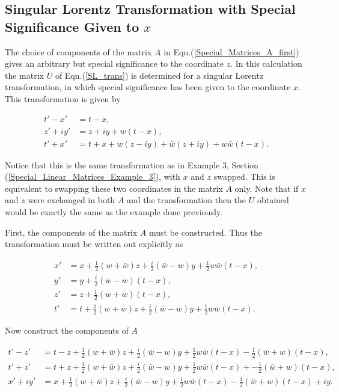 \newpage

\begin{appendix}

\section{Singular Lorentz Transformation with Special Significance Given to $x$}\label{Appendix_Special_Significance_x}

The choice of components of the matrix $A$ in Eqn.(\ref{Special_Matrices_A_first}) gives an arbitrary but special significance to the coordinate $z$. In this calculation the matrix $U$ of Eqn.(\ref{SL_trans}) is determined for a singular Lorentz transformation, in which special significance has been given to the coordinate $x$. This transformation is given by

\begin{align*}
t'-x' & = t-x, \\
z'+iy' & = z + iy + w(t-x), \\
t'+x' & = t+x + w(z-iy) + \bar{w} (z + iy) + w \bar{w} (t-x).
\end{align*}

\noindent Notice that this is the same transformation as in Example 3, Section (\ref{Special_Linear_Matrices_Example_3}), with $x$ and $z$ swapped. This is equivalent to swapping these two coordinates in the matrix $A$ only. Note that if $x$ and $z$ were exchanged in both $A$ and the transformation then the $U$ obtained would be exactly the same as the example done previously.

First, the components of the matrix $A$ must be constructed. Thus the transformation must be written out explicitly as 

\begin{align*}
x' & = x + \frac{1}{2} (w + \bar{w})z + \frac{i}{2}(\bar{w}- w)y + \frac{1}{2}w\bar{w}(t-x), \\
y' & = y + \frac{i}{2} (\bar{w} - w)(t-x), \\
z' & = z + \frac{1}{2} (w + \bar{w})(t-x), \\
t' & = t + \frac{1}{2} (w + \bar{w})z + \frac{i}{2} (\bar{w}-w)y + \frac{1}{2} w\bar{w}(t-x).
\end{align*}

\noindent Now construct the components of $A$

\begin{subequations}
\begin{align}
\label{Appendix_1_28_a}
t' - z' & = t - z + \frac{1}{2}(w + \bar{w})z + \frac{i}{2} (\bar{w}-w)y + \frac{1}{2}w\bar{w}(t-x) - \frac{1}{2}(\bar{w} + w)(t-x),\\
\label{Appendix_1_28_b}
t' + z' & = t + z + \frac{1}{2}(w + \bar{w})z + \frac{i}{2} (\bar{w}-w)y + \frac{1}{2}w\bar{w}(t-x) + -\frac{1}{2}(\bar{w} + w)(t-x),\\
\label{Appendix_1_28_c}
x' + iy' & = x +  \frac{1}{2}(w + \bar{w})z + \frac{i}{2} (\bar{w}-w)y + \frac{1}{2}w\bar{w}(t-x) - \frac{1}{2}(\bar{w} + w)(t-x) + iy.
\end{align}
\end{subequations}


\end{appendix}
